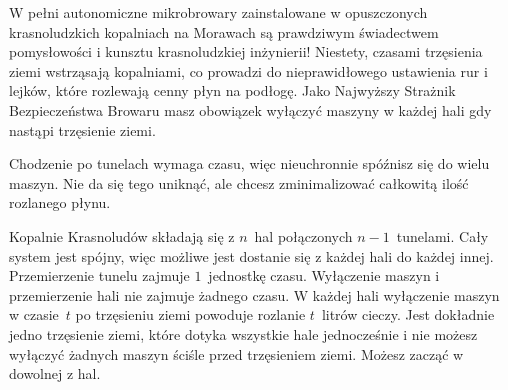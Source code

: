 
\noindent
W pełni autonomiczne mikrobrowary zainstalowane w opuszczonych krasnoludzkich kopalniach na Morawach są prawdziwym świadectwem pomysłowości i kunsztu krasnoludzkiej inżynierii!
Niestety, czasami trzęsienia ziemi wstrząsają kopalniami, co prowadzi do nieprawidłowego ustawienia rur i lejków, które rozlewają cenny płyn na podłogę.
Jako Najwyższy Strażnik Bezpieczeństwa Browaru masz obowiązek wyłączyć maszyny w każdej hali gdy nastąpi trzęsienie ziemi.

Chodzenie po tunelach wymaga czasu, 
więc nieuchronnie spóźnisz się do wielu maszyn.
Nie da się tego uniknąć, ale chcesz zminimalizować całkowitą ilość rozlanego płynu.

\medskip
Kopalnie Krasnoludów składają się z $n$~hal połączonych $n-1$~tunelami.
Cały system jest spójny, więc możliwe jest dostanie się z każdej hali do każdej innej.
Przemierzenie tunelu zajmuje $1$~jednostkę czasu.
Wyłączenie maszyn i przemierzenie hali nie zajmuje żadnego czasu.
W każdej hali wyłączenie maszyn w czasie~$t$ po trzęsieniu ziemi powoduje rozlanie $t$~litrów cieczy.
Jest dokładnie jedno trzęsienie ziemi, które dotyka wszystkie hale jednocześnie i nie możesz wyłączyć żadnych maszyn ściśle przed trzęsieniem ziemi.
Możesz zacząć w dowolnej z hal.


